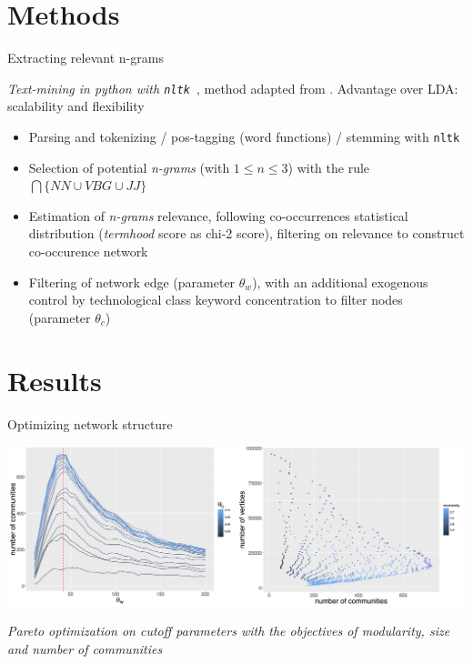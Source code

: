 \documentclass{beamer}
\begin{document}
\section{Methods}
\begin{frame}{Extracting relevant n-grams}
    
    
    \textit{Text-mining in python with \texttt{nltk}~\cite{bird2006nltk}}, method adapted from
\cite{chavalarias2013phylomemetic}. Advantage over LDA: scalability and flexibility

   

\bigskip

\begin{itemize}
\item Parsing and tokenizing / pos-tagging (word functions) / stemming  with \texttt{nltk}
\item Selection of potential \textit{n-grams} (with $1 \leq n \leq 3$) with the rule $\bigcap \{NN \cup VBG \cup JJ \}$
\item Estimation of \textit{n-grams} relevance, following co-occurrences statistical distribution (\textit{termhood} score as chi-2 score), filtering on relevance to construct co-occurence network
\item Filtering of network edge (parameter $\theta_w$), with an additional exogenous control by technological class keyword concentration to filter nodes (parameter $\theta_c$)
\end{itemize}
\end{frame}


\section{Results}
\begin{frame}{Optimizing network structure}
    
    \centering
    \includegraphics[width=\textwidth]{figures/Fig1.png}
    
    \medskip
    
    \textit{Pareto optimization on cutoff parameters with the objectives of modularity, size and number of communities}
    
\end{frame}
\end{document}
